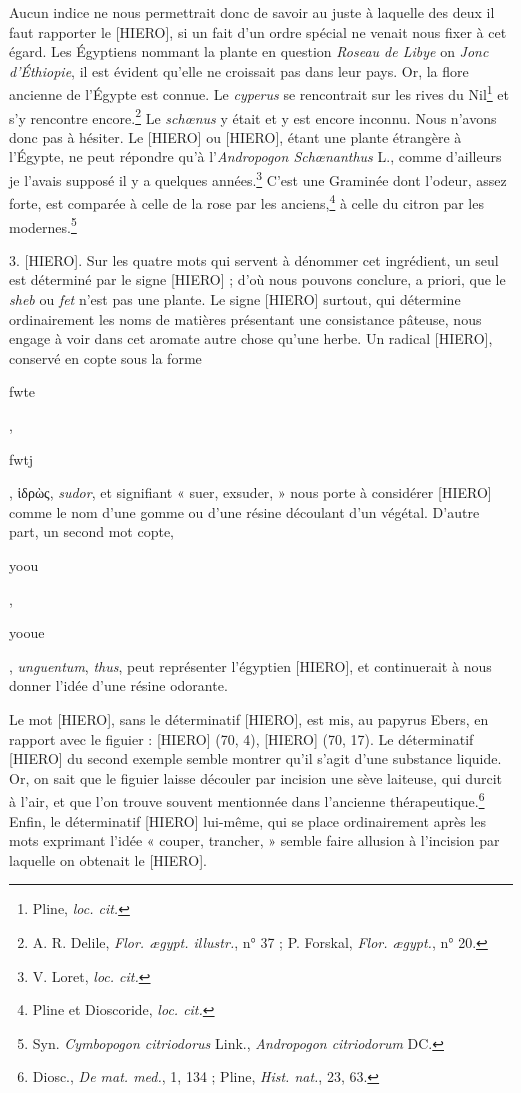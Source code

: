 \documentclass[a4paper, 11pt, oneside, landscape]{article}
\begin{document}
Aucun indice ne nous permettrait donc de savoir au juste à laquelle des deux il faut rapporter le [HIERO], si un fait d'un ordre spécial ne venait nous fixer à cet égard. Les Égyptiens nommant la plante en question \emph{Roseau de Libye} on \emph{Jonc d'Éthiopie}, il est évident qu'elle ne croissait pas dans leur pays. Or, la flore ancienne de l'Égypte est connue. Le \emph{cyperus} se rencontrait sur les rives du Nil\footnote{Pline, \emph{loc. cit.}} et s'y rencontre encore.\footnote{A. R. Delile, \emph{Flor. ægypt. illustr.}, n° 37 ; P. Forskal, \emph{Flor. ægypt.}, n° 20.} Le \emph{schœnus} y était et y est encore inconnu. Nous n'avons donc pas à hésiter. Le [HIERO] ou [HIERO], étant une plante étrangère à l'Égypte, ne peut répondre qu'à l'\emph{Andropogon Schœnanthus} L., comme d'ailleurs je l'avais supposé il y a quelques années.\footnote{V. Loret, \emph{loc. cit.}} C'est une Graminée dont l'odeur, assez forte, est comparée à celle de la rose par les anciens,\footnote{Pline et Dioscoride, \emph{loc. cit.}} à celle du citron par les modernes.\footnote{Syn. \emph{Cymbopogon citriodorus} Link., \emph{Andropogon citriodorum} DC.}

3. [HIERO]. Sur les quatre mots qui servent à dénommer cet ingrédient, un seul est déterminé par le signe [HIERO] ; d'où nous pouvons conclure, a priori, que le \emph{sheb} ou \emph{fet} n'est pas une plante. Le signe [HIERO] surtout, qui détermine ordinairement les noms de matières présentant une consistance pâteuse, nous engage à voir dans cet aromate autre chose qu'une herbe. Un radical [HIERO], conservé en copte sous la forme \begin{coptic}fwte\end{coptic}, \begin{coptic}fwtj\end{coptic}, ἱδρὼς, \emph{sudor}, et signifiant « suer, exsuder, » nous porte à considérer [HIERO] comme le nom d'une gomme ou d'une résine découlant d'un végétal. D'autre part, un second mot copte, \begin{coptic}yoou\end{coptic}, \begin{coptic}yooue\end{coptic}, \emph{unguentum}, \emph{thus}, peut représenter l'égyptien [HIERO], et continuerait à nous donner l'idée d'une résine odorante.

Le mot [HIERO], sans le déterminatif [HIERO], est mis, au papyrus Ebers, en rapport avec le figuier : [HIERO] (70, 4), [HIERO] (70, 17). Le déterminatif [HIERO] du second exemple semble montrer qu'il s'agit d'une substance liquide. Or, on sait que le figuier laisse découler par incision une sève laiteuse, qui durcit à l'air, et que l'on trouve souvent mentionnée dans l'ancienne thérapeutique.\footnote{Diosc., \emph{De mat. med.}, 1, 134 ; Pline, \emph{Hist. nat.}, 23, 63.} Enfin, le déterminatif [HIERO] lui-même, qui se place ordinairement après les mots exprimant l'idée « couper, trancher, » semble faire allusion à l'incision par laquelle on obtenait le [HIERO].
\end{document}
